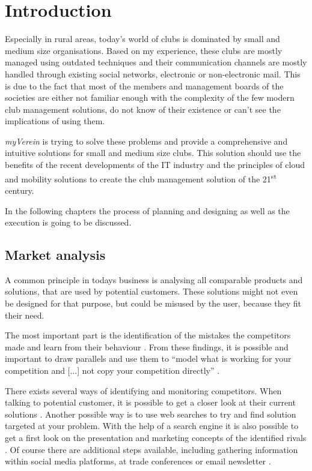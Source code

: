 \pagestyle{fancy}
\lhead{}
\renewcommand{\headrulewidth}{0pt}
\setlength{\headheight}{14pt}

\chapter{Introduction}

Especially in rural areas, today's world of clubs is dominated by small and medium size organisations. Based on my experience, these clubs are mostly managed using outdated techniques and their communication channels are mostly handled through existing social networks, electronic or non-electronic mail. This is due to the fact that most of the members and management boards of the societies are either not familiar enough with the complexity of the few modern club management solutions, do not know of their existence or can't see the implications of using them.

\emph{myVerein} is trying to solve these problems and provide a comprehensive and intuitive solutions for small and medium size clubs. This solution should use the benefits of the recent developments of the IT industry and the principles of cloud and mobility solutions to create the club management solution of the 21\textsuperscript{st} century. 

In the following chapters the process of planning and designing as well as the execution is going to be discussed. 

\section{Market analysis}
A common principle in todays business is analysing all comparable products and solutions, that are used by potential customers. These solutions might not even be designed for that purpose, but could be misused by the user, because they fit their need.

The most important part is the identification of the mistakes the competitors made and learn from their behaviour \cite{Hunter:2015aa}. From these findings, it is possible and important to draw parallels and use them to \enquote{model what is working for your competition and [...] not copy your competition directly} \cite{Hunter:2015aa}. 

There exists several ways of identifying and monitoring competitors. When talking to potential customer, it is possible to get a closer look at their current solutions \cite{Philips:2015aa}. Another possible way is to use web searches to try and find solution targeted at your problem. With the help of a search engine it is also possible to get a first look on the presentation and marketing concepts of the identified rivals \cite{Philips:2015aa}. Of course there are additional steps available, including gathering information within social media platforms, at trade conferences or email newsletter \cite{Dahl:2011aa}. 

